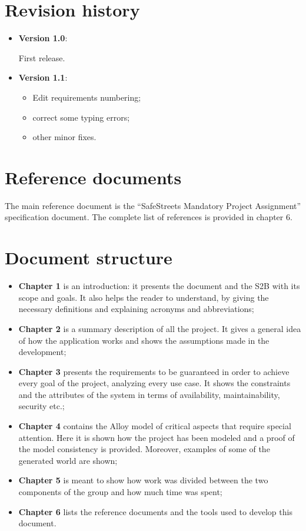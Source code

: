 \documentclass[12pt,a4paper]{report}
\begin{document}
	\section{Revision history}
\begin{itemize}
	\item\textbf{Version 1.0}:

	First release.
	\item\textbf{Version 1.1}:
\begin{itemize}
	\item{}Edit requirements numbering;
	\item{}correct some typing errors;
	\item{}other minor fixes.
\end{itemize}

\end{itemize}


	\section{Reference documents}
	The main reference document is the ``SafeStreets Mandatory Project Assignment'' specification document. The complete list of references is provided in chapter 6.

	\section{Document structure}
	\begin{itemize}
	\item \textbf{Chapter 1} is an introduction: it presents the document and the S2B with its scope and goals. It also helps the reader to understand, by giving the necessary definitions and explaining acronyms and abbreviations; 
	\item \textbf{Chapter 2} is a summary description of all the project. It gives a general idea of how the application works and shows the assumptions made in the development;
	\item \textbf{Chapter 3} presents the requirements to be guaranteed in order to achieve every goal of the project, analyzing every use case. It shows the constraints and the attributes of the system in terms of availability, maintainability, security etc.;
	\item \textbf{Chapter 4} contains the Alloy model of critical aspects that require special attention. Here it is shown how the project has been modeled and a proof of the model consistency is provided. Moreover, examples of some of the generated world are shown;
	\item \textbf{Chapter 5} is meant to show how work was divided between the two components of the group and how much time was spent;
	\item \textbf{Chapter 6} lists the reference documents and the tools used to develop this document.
	\end{itemize}
\end{document}

